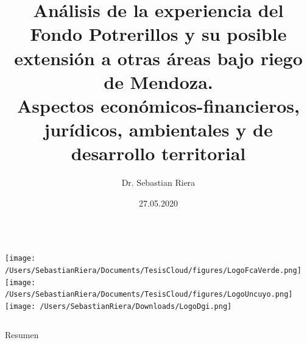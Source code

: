 \documentclass{beamer}\usepackage[]{graphicx}\usepackage[]{color}
\title[Sebastián Riera, Ph.D.]{Análisis de la experiencia del Fondo Potrerillos y su posible extensión a otras áreas bajo riego de Mendoza.\\ Aspectos económicos-financieros, jurídicos, ambientales y de desarrollo territorial}
\author{Dr. Sebastian Riera}
\institute{Avances en materia económica - 2020}   %
\date{27.05.2020}
\newcommand\blfootnote[1]{%
\begingroup
\renewcommand\thefootnote{}\footnote{#1}%
\addtocounter{footnote}{-1}%
\endgroup
}
\begin{document}
{
\begin{frame} \vspace*{.5cm}\titlepage  
  \begin{columns}
    \texttt{[image: /Users/SebastianRiera/Documents/TesisCloud/figures/LogoFcaVerde.png]}
    \texttt{[image: /Users/SebastianRiera/Documents/TesisCloud/figures/LogoUncuyo.png]}
    \texttt{[image: /Users/SebastianRiera/Downloads/LogoDgi.png]}
  \end{columns}
\end{frame}
}
\addtocounter{framenumber}{-1}

























\begin{frame}{Resumen}
 \footnotesize \tableofcontents
\end{frame}



\end{document}
